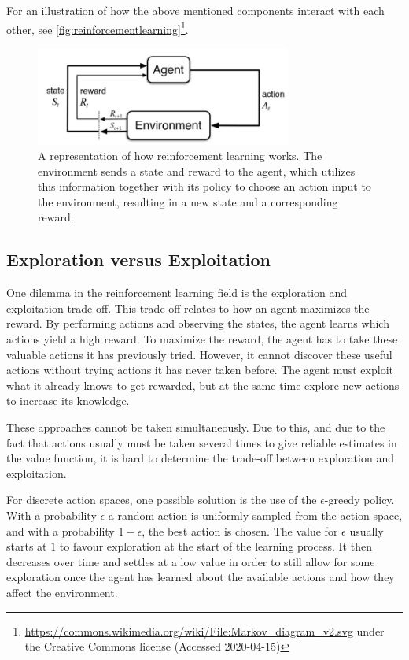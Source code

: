 \documentclass{kththesis}
\begin{document}
For an illustration of how the above mentioned components interact with each other, see \autoref{fig:reinforcementlearning}\footnote{\url{https://commons.wikimedia.org/wiki/File:Markov_diagram_v2.svg} under the Creative Commons license (Accessed 2020-04-15)}.

\begin{figure}
\centering
\includegraphics[width=0.75\textwidth]{reinforcement-learning.jpg}
\caption{A representation of how reinforcement learning works. The environment sends a state and reward to the agent, which utilizes this information together with its policy to choose an action input to the environment, resulting in a new state and a corresponding reward.}
\label{fig:reinforcementlearning}
\end{figure}

\subsection{Exploration versus Exploitation}
\label{subsec:explorevsexploit}
One dilemma in the reinforcement learning field is the exploration and exploitation trade-off. This trade-off relates to how an agent maximizes the reward. By performing actions and observing the states, the agent learns which actions yield a high reward. To maximize the reward, the agent has to take these valuable actions it has previously tried. However, it cannot discover these useful actions without trying actions it has never taken before. The agent must exploit what it already knows to get rewarded, but at the same time explore new actions to increase its knowledge.

These approaches cannot be taken simultaneously. Due to this, and due to the fact that actions usually must be taken several times to give reliable estimates in the value function, it is hard to determine the trade-off between exploration and exploitation.

For discrete action spaces, one possible solution is the use of the $\epsilon$-greedy policy. With a probability $\epsilon$ a random action is uniformly sampled from the action space, and with a probability $1 - \epsilon$, the best action is chosen. The value for $\epsilon$ usually starts at $1$ to favour exploration at the start of the learning process. It then decreases over time and settles at a low value in order to still allow for some exploration once the agent has learned about the available actions and how they affect the environment. \parencite{sutton1998introduction}
\end{document}
